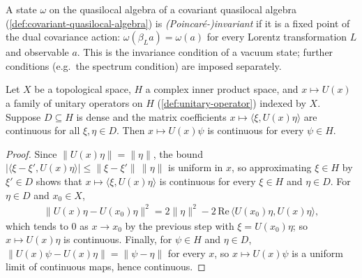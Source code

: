 \begin{definition}
    \label{def:invariant-state}
    \leanok
    A state $\omega$ on the quasilocal algebra of a covariant quasilocal algebra (\ref{def:covariant-quasilocal-algebra}) is \emph{(Poincar\'e-)invariant} if it is a fixed point of the dual covariance action: $\omega(\beta_L a) = \omega(a)$ for every Lorentz transformation $L$ and observable $a$. This is the invariance condition of a vacuum state; further conditions (e.g.\ the spectrum condition) are imposed separately.
\end{definition}

\begin{lemma}
    \label{lmm:weak-continuity-implies-strong}
    \leanok
    Let $X$ be a topological space, $H$ a complex inner product space, and $x \mapsto U(x)$ a family of unitary operators on $H$ (\ref{def:unitary-operator}) indexed by $X$. Suppose $D \subseteq H$ is dense and the matrix coefficients $x \mapsto \langle \xi, U(x)\eta \rangle$ are continuous for all $\xi, \eta \in D$. Then $x \mapsto U(x)\psi$ is continuous for every $\psi \in H$.
\end{lemma}
\begin{proof}
    \leanok
    Since $\|U(x)\eta\| = \|\eta\|$, the bound $|\langle \xi - \xi', U(x)\eta\rangle| \le \|\xi - \xi'\|\,\|\eta\|$ is uniform in $x$, so approximating $\xi \in H$ by $\xi' \in D$ shows that $x \mapsto \langle \xi, U(x)\eta\rangle$ is continuous for every $\xi \in H$ and $\eta \in D$. For $\eta \in D$ and $x_0 \in X$,
    \begin{align}
        \|U(x)\eta - U(x_0)\eta\|^2 = 2\|\eta\|^2 - 2\,\mathrm{Re}\,\langle U(x_0)\eta, U(x)\eta\rangle,
    \end{align}
    which tends to $0$ as $x \to x_0$ by the previous step with $\xi = U(x_0)\eta$; so $x \mapsto U(x)\eta$ is continuous. Finally, for $\psi \in H$ and $\eta \in D$, $\|U(x)\psi - U(x)\eta\| = \|\psi - \eta\|$ for every $x$, so $x \mapsto U(x)\psi$ is a uniform limit of continuous maps, hence continuous.
\end{proof}

